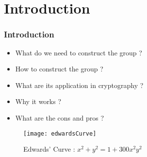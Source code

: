 \section{Introduction}


\begin{frame}[t]
    \frametitle{Introduction}

    \begin{minipage}[t]{0.5\linewidth}
    \begin{itemize}
        \item What do we need to construct the group ?
        \item How to construct the group ?
        \item What are its application in cryptography ?
        \item Why it works ? 
        \item What are the cons and pros ?
    \end{itemize}
    \end{minipage}%
    \hfill%
    \begin{minipage}[t]{0.3\linewidth}
        \begin{figure}[h]
            \centering
            \texttt{[image: edwardsCurve]}
            \caption{Edwards' Curve : $x^2 + y^2 = 1 + 300x^2y^2$}
            \label{fig:edwardsCurve}
        \end{figure}
    \end{minipage}
\end{frame}
